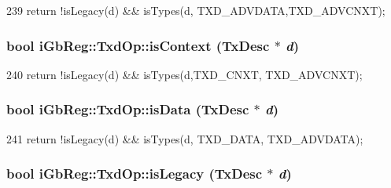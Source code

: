 \begin{DoxyCode}
239 { return !isLegacy(d) && isTypes(d, TXD_ADVDATA,TXD_ADVCNXT);  }
\end{DoxyCode}
\hypertarget{namespaceiGbReg_1_1TxdOp_a91da43b92c742f43f0aee2bc07d15fe2}{
\subsubsection[{isContext}]{\setlength{\rightskip}{0pt plus 5cm}bool iGbReg::TxdOp::isContext (TxDesc $\ast$ {\em d})}}
\label{namespaceiGbReg_1_1TxdOp_a91da43b92c742f43f0aee2bc07d15fe2}



\begin{DoxyCode}
240 { return !isLegacy(d) && isTypes(d,TXD_CNXT, TXD_ADVCNXT); }
\end{DoxyCode}
\hypertarget{namespaceiGbReg_1_1TxdOp_a6986d9be70f07915ad25bf0892c3c5d7}{
\subsubsection[{isData}]{\setlength{\rightskip}{0pt plus 5cm}bool iGbReg::TxdOp::isData (TxDesc $\ast$ {\em d})}}
\label{namespaceiGbReg_1_1TxdOp_a6986d9be70f07915ad25bf0892c3c5d7}



\begin{DoxyCode}
241 { return !isLegacy(d) && isTypes(d, TXD_DATA, TXD_ADVDATA); }
\end{DoxyCode}
\hypertarget{namespaceiGbReg_1_1TxdOp_af55d26465a475bf81ed6f357bdf7c1b1}{
\subsubsection[{isLegacy}]{\setlength{\rightskip}{0pt plus 5cm}bool iGbReg::TxdOp::isLegacy (TxDesc $\ast$ {\em d})}}
\label{namespaceiGbReg_1_1TxdOp_af55d26465a475bf81ed6f357bdf7c1b1}




